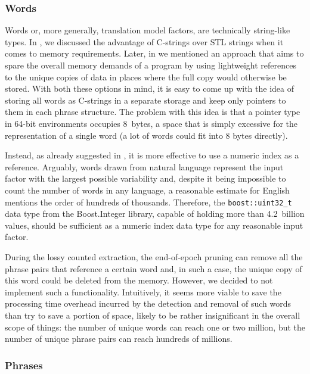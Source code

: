 \subsubsection*{Words}

Words or, more generally, translation model factors, are technically string-like types.
In , we discussed the advantage of C-strings over STL strings when
it comes to memory requirements.
Later, in  we mentioned an approach that aims to spare the
overall memory demands of a program by using lightweight references to the unique copies of
data in places where the full copy would otherwise be stored.
With both these options in mind, it is easy to come up with the idea of storing all words as
C-strings in a separate storage and keep only pointers to them in each phrase structure.
The problem with this idea is that a pointer type in 64-bit environments occupies
8~bytes, a space that is simply excessive for the representation of a single word (a lot of
words could fit into 8 bytes directly).

Instead, as already suggested in , it is more effective to
use a numeric index as a reference.
Arguably, words drawn from natural language represent the input factor with the largest possible
variability and, despite it being impossible to count the number of words in any language,
a reasonable estimate for English mentions the order of hundreds of thousands.
Therefore, the \texttt{boost::uint32_t} data type from the Boost.Integer library, capable
of holding more than 4.2~billion values, should be sufficient as a numeric index data
type for any reasonable input factor.

During the lossy counted extraction, the end-of-epoch pruning can remove all the phrase
pairs that reference a certain word and, in such a case, the unique copy of this word could
be deleted from the memory. However, we decided to not implement such a functionality.
Intuitively, it seems more viable to save the processing time overhead incurred by
the detection and removal of such words than try to save a portion of space, likely to
be rather insignificant in the overall scope of things: the number of unique words can reach
one or two million, but the number of unique phrase pairs can reach hundreds of millions.

\subsubsection*{Phrases}

